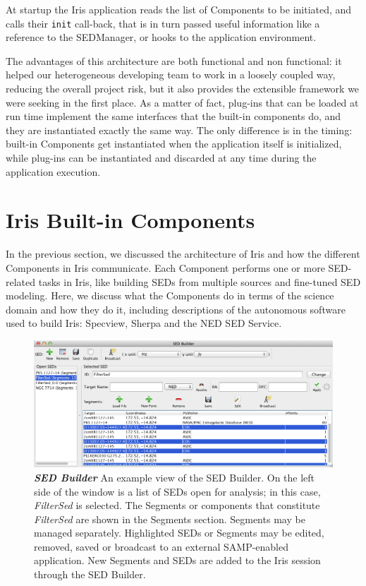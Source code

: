 \documentclass[final,5p,authoryear]{elsarticle}
\begin{document}
At startup the Iris application reads the list of Components to be initiated,
and calls their \verb|init| call-back, that is in turn passed useful information
like a reference to the SEDManager, or hooks to the application environment.

The advantages of this architecture are both functional and non functional: it
helped our heterogeneous developing team to work in a loosely coupled way,
reducing the overall project risk, but it also provides the extensible framework
we were seeking in the first place. As a matter of fact, plug-ins that can be
loaded at run time implement the same interfaces that the built-in components
do, and they are instantiated exactly the same way. The only difference is in
the timing: built-in Components get instantiated when the application itself is
initialized, while plug-ins can be instantiated and discarded at any time during
the application execution.

\section{Iris Built-in Components} \label{sec:components} In the previous
section, we discussed the architecture of Iris and how the different Components
in Iris communicate. Each Component performs one or more SED-related tasks in
Iris, like building SEDs from multiple sources and fine-tuned SED modeling.
Here, we discuss what the Components do in terms of the science domain and how
they do it, including descriptions of the autonomous software used to build
Iris: Specview, Sherpa and the NED SED Service.

\begin{figure} \begin{center}
\includegraphics[width=\textwidth]{figures/sed_builder.png}
\caption{\textit{\textbf{SED Builder}} An example view of the SED Builder. On
the left side of the window is a list of SEDs open for analysis; in this case,
\textit{FilterSed} is selected. The Segments or components that constitute
\textit{FilterSed} are shown in the Segments section. Segments may be managed
separately. Highlighted SEDs or Segments may be edited, removed, saved or
broadcast to an external SAMP-enabled application. New Segments and SEDs are
added to the Iris session through the SED Builder. } \label{fig:sed_builder}
\end{center} \end{figure}
\end{document}
